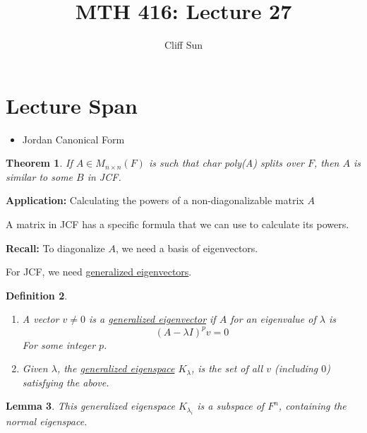 \documentclass{article}
\title{MTH 416: Lecture 27}
\author{Cliff Sun}
\newtheorem{theorem}{Theorem}[section]
\newtheorem{lemma}[theorem]{Lemma}
\newtheorem{definition}[theorem]{Definition}
\newtheorem{one minute paper}[theorem]{One Minute Paper}
\begin{document}
\maketitle

\section*{Lecture Span}
\begin{itemize}
    \item Jordan Canonical Form
\end{itemize}

\begin{theorem}
    If $A \in M_{n\times n}(F)$ is such that char poly(A) splits over $F$, then $A$ is similar to some $B$ in JCF. 
\end{theorem}

\begin{center}
    \textbf{Application:} Calculating the powers of a non-diagonalizable matrix $A$
\end{center}

A matrix in JCF has a specific formula that we can use to calculate its powers.

\begin{center}
    \textbf{Recall:} To diagonalize $A$, we need a basis of eigenvectors.
\end{center}

For JCF, we need \underline{generalized eigenvectors}. 

\begin{definition}
    \begin{enumerate}
        \item A vector $v\neq 0$ is a \underline{generalized eigenvector} if $A$ for an eigenvalue of $\lambda$ is 
        \begin{equation}
            (A - \lambda I)^{p}v = 0
        \end{equation}
        For some integer $p$. 
        \item Given $\lambda$, the \underline{generalized eigenspace} $K_{\lambda}$, is the set of all $v$ (including $0$) satisfying the above. 
    \end{enumerate}
\end{definition}

\begin{lemma}
    This generalized eigenspace $K_{\lambda_i}$ is a subspace of $F^{n}$, containing the normal eigenspace. 
\end{lemma}
\end{document}
